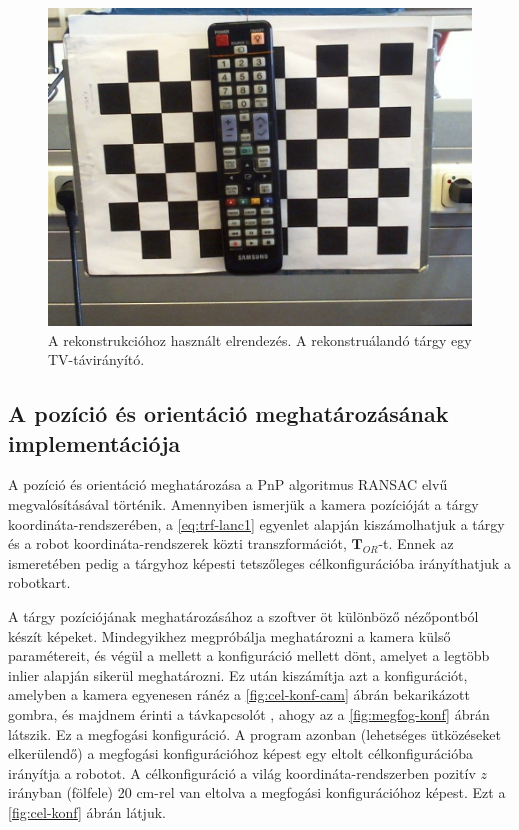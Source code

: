 \begin{figure}[H]
\centering
\includegraphics[width=\linewidth]{chapters/implementation/3dreconstr.jpg}
\caption{A rekonstrukcióhoz használt elrendezés. A rekonstruálandó tárgy egy TV-távirányító.}
\label{fig:reconstr-img}
\end{figure}

\subsection{A pozíció és orientáció meghatározásának implementációja}

A pozíció és orientáció meghatározása a PnP algoritmus RANSAC elvű megvalósításával történik. Amennyiben ismerjük a kamera pozícióját a tárgy koordináta-rendszerében, a \eqref{eq:trf-lanc1} egyenlet alapján kiszámolhatjuk a tárgy és a robot koordináta-rendszerek közti transzformációt, $\mathbf{T}_{OR}$-t. Ennek az ismeretében pedig a tárgyhoz képesti tetszőleges célkonfigurációba irányíthatjuk a robotkart.

A tárgy pozíciójának meghatározásához a szoftver öt különböző nézőpontból készít képeket. Mindegyikhez megpróbálja meghatározni a kamera külső paramétereit, és végül a mellett a konfiguráció mellett dönt, amelyet a legtöbb inlier alapján sikerül meghatározni. Ez után kiszámítja azt a konfigurációt, amelyben a kamera egyenesen ránéz a \ref{fig:cel-konf-cam} ábrán bekarikázott gombra, és majdnem érinti a távkapcsolót , ahogy az a \ref{fig:megfog-konf} ábrán látszik. Ez a megfogási konfiguráció. A program azonban (lehetséges ütközéseket elkerülendő) a megfogási konfigurációhoz képest egy eltolt célkonfigurációba irányítja a robotot. A célkonfiguráció a világ koordináta-rendszerben pozitív $z$ irányban (fölfele) 20 cm-rel van eltolva a megfogási konfigurációhoz képest. Ezt a \ref{fig:cel-konf} ábrán látjuk.

